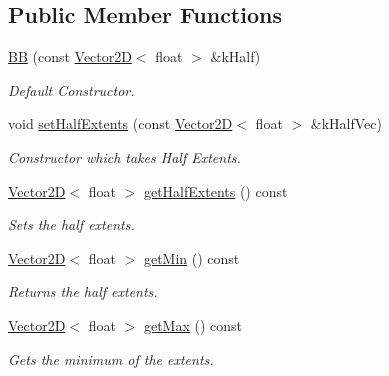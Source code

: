 \subsection*{Public Member Functions}
\begin{DoxyCompactItemize}
\item 
\hypertarget{class_b_b_ab2ee40c3f06e1ff92bbcfed63b571565}{\hyperlink{class_b_b_ab2ee40c3f06e1ff92bbcfed63b571565}{B\+B} (const \hyperlink{class_vector2_d}{Vector2\+D}$<$ float $>$ \&k\+Half)}\label{class_b_b_ab2ee40c3f06e1ff92bbcfed63b571565}

\begin{DoxyCompactList}\small\item\em Default Constructor. \end{DoxyCompactList}\item 
\hypertarget{class_b_b_ac3c2f415b7e81f0a04926738a6c40081}{void \hyperlink{class_b_b_ac3c2f415b7e81f0a04926738a6c40081}{set\+Half\+Extents} (const \hyperlink{class_vector2_d}{Vector2\+D}$<$ float $>$ \&k\+Half\+Vec)}\label{class_b_b_ac3c2f415b7e81f0a04926738a6c40081}

\begin{DoxyCompactList}\small\item\em Constructor which takes Half Extents. \end{DoxyCompactList}\item 
\hypertarget{class_b_b_a77e5f3c60978b35a4c5c5daa9185dcbf}{\hyperlink{class_vector2_d}{Vector2\+D}$<$ float $>$ \hyperlink{class_b_b_a77e5f3c60978b35a4c5c5daa9185dcbf}{get\+Half\+Extents} () const }\label{class_b_b_a77e5f3c60978b35a4c5c5daa9185dcbf}

\begin{DoxyCompactList}\small\item\em Sets the half extents. \end{DoxyCompactList}\item 
\hypertarget{class_b_b_ae015b360c554243f6024e0939e9a7760}{\hyperlink{class_vector2_d}{Vector2\+D}$<$ float $>$ \hyperlink{class_b_b_ae015b360c554243f6024e0939e9a7760}{get\+Min} () const }\label{class_b_b_ae015b360c554243f6024e0939e9a7760}

\begin{DoxyCompactList}\small\item\em Returns the half extents. \end{DoxyCompactList}\item 
\hypertarget{class_b_b_a4e4856d6d91a5c0995cefcf6157dcf2f}{\hyperlink{class_vector2_d}{Vector2\+D}$<$ float $>$ \hyperlink{class_b_b_a4e4856d6d91a5c0995cefcf6157dcf2f}{get\+Max} () const }\label{class_b_b_a4e4856d6d91a5c0995cefcf6157dcf2f}

\begin{DoxyCompactList}\small\item\em Gets the minimum of the extents. \end{DoxyCompactList}\end{DoxyCompactItemize}
